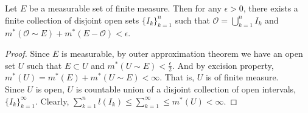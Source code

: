 \begin{theorem}
	Let $E$ be a measurable set of finite measure.
	Then for any $\epsilon > 0$, there exists a finite collection of disjoint open sets $\{ I_k \}_{k=1}^n$ such that  $\mathcal{O} = \displaystyle\bigcup_{k=1}^n I_k$ and $m^\ast(\mathcal{O} \sim E) + m^\ast(E-\mathcal{O}) < \epsilon$.
\end{theorem}
\begin{proof}
	Since $E$ is measurable, by outer approximation theorem we have an open set $U$ such that $E \subset U$ and $m^\ast(U \sim E) < \frac{\epsilon}{2}$.
	And by excision property, $m^\ast(U) = m^\ast(E)+m^\ast(U \sim E) < \infty$.
	That is, $U$ is of finite measure.\\

	Since $U$ is open, $U$ is countable union of a disjoint collection of open intervals, $\{ I_k \}_{k=1}^\infty$.
	Clearly, $\displaystyle\sum_{k=1}^n l(I_k) \le \displaystyle\sum_{k=1}^\infty \le m^\ast(U) < \infty$.

\end{proof}
